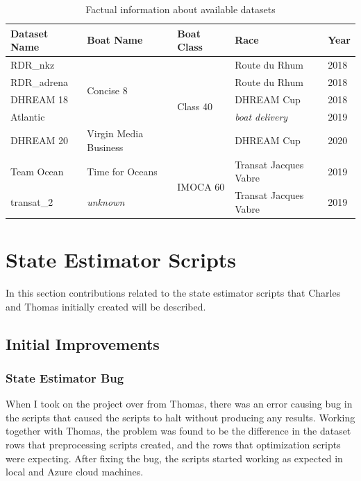 \documentclass[12pt,twoside]{report}
\begin{document}
\begin{table}[]
\centering
\begin{tabular}{|l|l|l|l|l|}
\hline
\textbf{Dataset Name} & \textbf{Boat Name}         & \textbf{Boat Class}       & \textbf{Race}          & \textbf{Year} \\ \hline
RDR\_nkz              & \multirow{4}{*}{Concise 8} & \multirow{5}{*}{Class 40} & Route du Rhum          & 2018          \\ \cline{1-1} \cline{4-5} 
RDR\_adrena           &                            &                           & Route du Rhum          & 2018          \\ \cline{1-1} \cline{4-5} 
DHREAM 18             &                            &                           & DHREAM Cup             & 2018          \\ \cline{1-1} \cline{4-5} 
Atlantic              &                            &                           & \textit{boat delivery} & 2019          \\ \cline{1-2} \cline{4-5} 
DHREAM 20             & Virgin Media Business      &                           & DHREAM Cup             & 2020          \\ \hline
Team Ocean            & Time for Oceans            & \multirow{2}{*}{IMOCA 60} & Transat Jacques Vabre  & 2019          \\ \cline{1-2} \cline{4-5} 
transat\_2            & \textit{unknown}           &                           & Transat Jacques Vabre  & 2019          \\ \hline
\end{tabular}
\caption{Factual information about available datasets}
\label{tab:my-table}
\end{table}

\section{State Estimator Scripts}
In this section contributions related to the state estimator scripts that Charles and Thomas initially created will be described.

\subsection{Initial Improvements}

\subsubsection{State Estimator Bug}
When I took on the project over from Thomas, there was an error causing bug in the scripts that caused the scripts to halt without producing any results. Working together with Thomas, the problem was found to be the difference in the dataset rows that preprocessing scripts created, and the rows that optimization scripts were expecting. After fixing the bug, the scripts started working as expected in local and Azure cloud machines.
\end{document}
